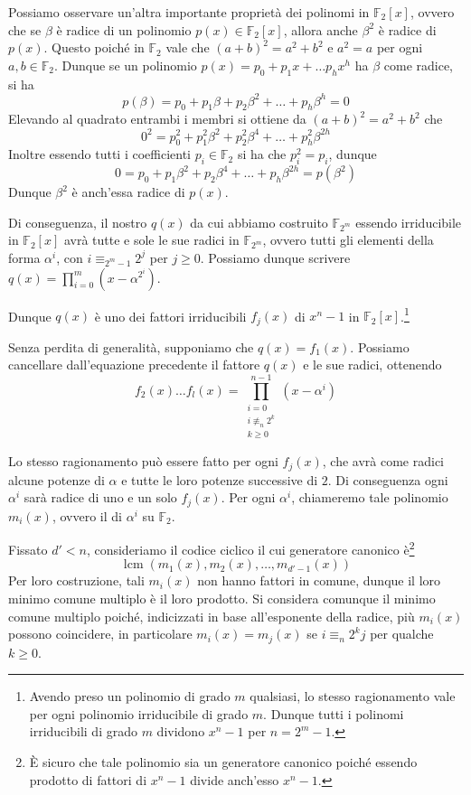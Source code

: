 Possiamo osservare un'altra importante proprietà dei polinomi in \(\mathbb{F}_2[x]\), ovvero che se \(\beta\) è radice di un polinomio \(p(x) \in \mathbb{F}_2[x]\), allora anche \(\beta^2\) è radice di \(p(x)\).
Questo poiché in \(\mathbb{F}_2\) vale che \({(a+b)}^2 = a^2 + b^2\) e \(a^2 = a\) per ogni \(a,b \in \mathbb{F}_2\).
Dunque se un polinomio \(p(x) = p_0 + p_1 x + \ldots p_h x^h\) ha \(\beta\) come radice, si ha
\[p(\beta) = p_0 + p_1 \beta + p_2 \beta^2 + \ldots + p_h \beta^h = 0\]
Elevando al quadrato entrambi i membri si ottiene da \({(a+b)}^2 = a^2 + b^2\) che
\[0^2 = p_0^2 + p_1^2 \beta^2 + p_2^2 \beta^4 + \ldots + p_h^2 \beta^{2h} \]
Inoltre essendo tutti i coefficienti \(p_i \in \mathbb{F}_2\) si ha che \(p_i^2 = p_i\), dunque
\[0 = p_0 + p_1 \beta^2 + p_2 \beta^4 + \ldots + p_h \beta^{2h} = p(\beta^2)\]
Dunque \(\beta^2\) è anch'essa radice di \(p(x)\).

Di conseguenza, il nostro \(q(x)\) da cui abbiamo costruito \(\mathbb{F}_{2^m}\) essendo irriducibile in \(\mathbb{F}_2[x]\) avrà tutte e sole le sue radici in \(\mathbb{F}_{2^m}\), ovvero tutti gli elementi della forma \(\alpha^{i}\), con \(i \equiv_{2^m-1} 2^j\) per \(j \geq 0\).
Possiamo dunque scrivere \(q(x) = \prod_{i=0}^{m} (x-\alpha^{2^i})\).

Dunque \(q(x)\) è uno dei fattori irriducibili \(f_j(x)\) di \(x^n - 1\) in \(\mathbb{F}_2[x]\).\footnote{Avendo preso un polinomio di grado \(m\) qualsiasi, lo stesso ragionamento vale per ogni polinomio irriducibile di grado \(m\). Dunque tutti i polinomi irriducibili di grado \(m\) dividono \(x^n-1\) per \(n=2^m-1\).}

Senza perdita di generalità, supponiamo che \(q(x) = f_1(x)\).
Possiamo cancellare dall'equazione precedente il fattore \(q(x)\) e le sue radici, ottenendo
\[ f_2(x)\ldots f_l(x) = \prod_{\substack{i=0 \\ i \not\equiv_{n} 2^k\\k \geq 0}}^{n-1} (x - \alpha^i)\]

Lo stesso ragionamento può essere fatto per ogni \(f_j(x)\), che avrà come radici alcune potenze di \(\alpha\) e tutte le loro potenze successive di \(2\).
Di conseguenza ogni \(\alpha^i\) sarà radice di uno e un solo \(f_j(x)\).
Per ogni \(\alpha^i\), chiameremo tale polinomio \(m_i(x)\), ovvero il  di \(\alpha^i\) su \(\mathbb{F}_2\).

Fissato \(d'< n\), consideriamo il codice ciclico il cui generatore canonico è\footnote{È sicuro che tale polinomio sia un generatore canonico poiché essendo prodotto di fattori di \(x^n-1\) divide anch'esso \(x^n-1\).}
\[\operatorname{lcm}(m_1(x), m_2(x), \ldots, m_{d'-1}(x))\]
Per loro costruzione, tali \(m_i(x)\) non hanno fattori in comune, dunque il loro minimo comune multiplo è il loro prodotto.
Si considera comunque il minimo comune multiplo poiché, indicizzati in base all'esponente della radice, più \(m_i(x)\) possono coincidere, in particolare \(m_i(x) = m_j(x)\) se \(i \equiv_{n} 2^k j\) per qualche \(k \geq 0\).

